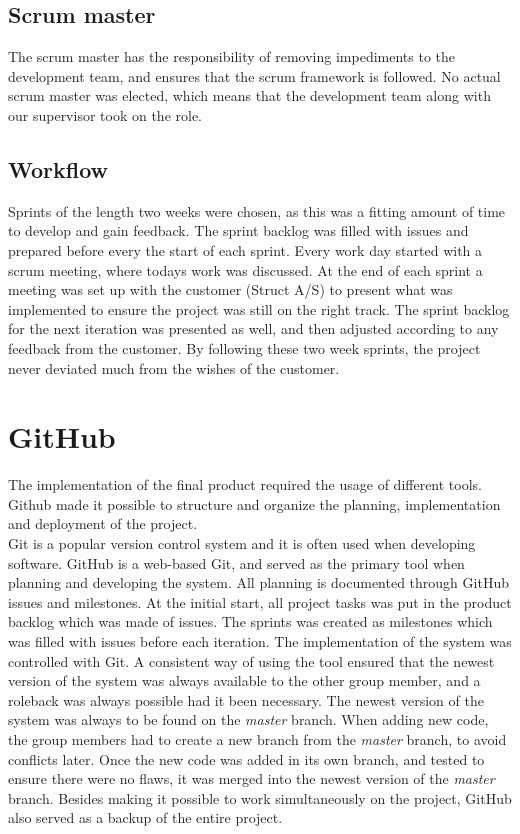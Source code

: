\subsection{Scrum master}
The scrum master has the responsibility of removing impediments to the development team, and ensures that the scrum framework is followed. No actual scrum master was elected, which means that the development team along with our supervisor took on the role.

\subsection{Workflow}
Sprints of the length two weeks were chosen, as this was a fitting amount of time to develop and gain feedback. The sprint backlog was filled with issues and prepared before every the start of each sprint. Every work day started with a scrum meeting, where todays work was discussed. At the end of each sprint a meeting was set up with the customer (Struct A/S) to present what was implemented to ensure the project was still on the right track. The sprint backlog for the next iteration was presented as well, and then adjusted according to any feedback from the customer.
By following these two week sprints, the project never deviated much from the wishes of the customer.


\section{GitHub}
The implementation of the final product required the usage of different tools. Github made it possible to structure and organize the planning, implementation and deployment of the project.\\

Git is a popular version control system and it is often used when developing software. GitHub is a web-based Git, and served as the primary tool when planning and developing the system. All planning is documented through GitHub issues and milestones. At the initial start, all project tasks was put in the product backlog which was made of issues. The sprints was created as milestones which was filled with issues before each iteration.
The implementation of the system was controlled with Git. A consistent way of using the tool ensured that the newest version of the system was always available to the other group member, and a roleback was always possible had it been necessary. The newest version of the system was always to be found on the \textit{master} branch. When adding new code, the group members had to create a new branch from the \textit{master} branch, to avoid conflicts later. Once the new code was added in its own branch, and tested to ensure there were no flaws, it was merged into the newest version of the \textit{master} branch.
Besides making it possible to work simultaneously on the project, GitHub also served as a backup of the entire project.
